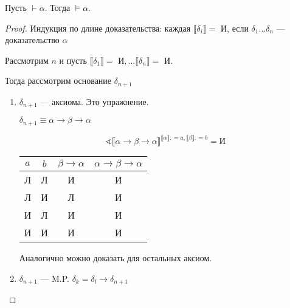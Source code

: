 \documentclass[12pt, a4paper, oneside]{book}
\begin{document}
\begin{theorem}
    Пусть \(\vdash \alpha\). Тогда \(\models \alpha\).
\end{theorem}
\begin{proof}
    Индукция по длине доказательства: каждая \(\llbracket \delta_i \rrbracket = \text{ И}\), если \(\delta_1 \dots \delta_n\) --- доказательство \(\alpha\)

    Рассмотрим \(n\) и пусть \(\llbracket \delta_1 \rrbracket = \text{ И}, \dots \llbracket \delta_n \rrbracket = \text{ И}\).

    Тогда рассмотрим основание \(\delta_{n + 1}\)
    \begin{enumerate}
        \item \(\delta_{n + 1}\) --- аксиома. Это упражнение.

              \begin{example}
                  \(\delta_{n + 1} \equiv \alpha \to \beta \to \alpha\)

                  \[\sphericalangle \llbracket \alpha \to \beta \to \alpha \rrbracket^{\llbracket \alpha \rrbracket : = a, \llbracket \beta \rrbracket : = b} = \text{И}\]

                  \begin{center}
                      \begin{tabular}{c|c|c|c}
                          \(a\) & \(b\) & \(\beta \to \alpha\) & \(\alpha \to \beta \to \alpha\) \\ \hline
                          Л     & Л     & И                    & И                               \\
                          Л     & И     & Л                    & И                               \\
                          И     & Л     & И                    & И                               \\
                          И     & И     & И                    & И                               \\
                      \end{tabular}
                  \end{center}
              \end{example}

              Аналогично можно доказать для остальных аксиом.

        \item \(\delta_{n + 1}\) --- M.P. \(\delta_k = \delta_l \to \delta_{n + 1}\)


\end{enumerate}
\end{proof}
\end{document}
